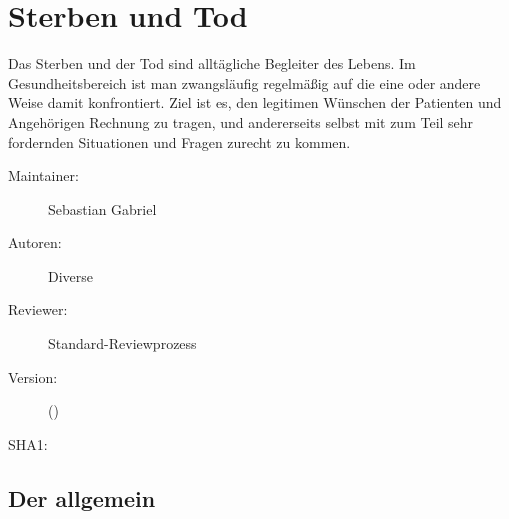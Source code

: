 % 
\def\ChapterCode{TOD}
\chapter
[\CO{[TOD]} Sterben und Tod]
{Sterben und Tod}
\label{chp:TOD}

\ChapterIntro
{%
\noindent Das Sterben und der Tod sind alltägliche Begleiter
des Lebens. Im Gesundheitsbereich ist man zwangsläufig
regelmäßig auf die eine oder andere Weise damit
konfrontiert. Ziel ist es, den legitimen Wünschen der
Patienten und Angehörigen Rechnung zu tragen, und
andererseits selbst mit zum Teil sehr fordernden Situationen
und Fragen zurecht zu kommen.
}
{%
\begin{description}
  \item[Maintainer:] Sebastian Gabriel
  \item[Autoren:] Diverse
  \item[Reviewer:] Standard-Reviewprozess
  \item[Version:] {\VarDocVersionTypeName} ({\VarDocVersionTypeDescription})
  \item[SHA1:] {\DocGitCommit}
\end{description}

{\TxTeilkapitelAASS}
}



\section{Der  allgemein}
\label{topic:tod}

